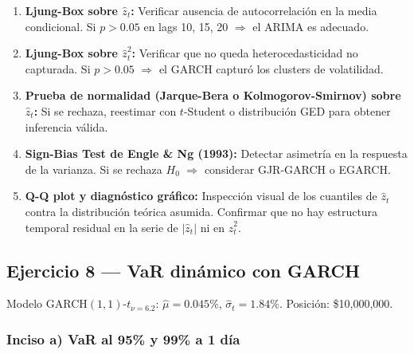 \documentclass[12pt,a4paper]{article}
\begin{document}
\begin{solucion}
\begin{enumerate}
  \item \textbf{Ljung-Box sobre $\hat{z}_t$:} Verificar ausencia de autocorrelación en la media condicional. Si $p>0.05$ en lags 10, 15, 20 $\Rightarrow$ el ARIMA es adecuado.
  \item \textbf{Ljung-Box sobre $\hat{z}_t^2$:} Verificar que no queda heterocedasticidad no capturada. Si $p>0.05$ $\Rightarrow$ el GARCH capturó los clusters de volatilidad.
  \item \textbf{Prueba de normalidad (Jarque-Bera o Kolmogorov-Smirnov) sobre $\hat{z}_t$:} Si se rechaza, reestimar con $t$-Student o distribución GED para obtener inferencia válida.
  \item \textbf{Sign-Bias Test de Engle \& Ng (1993):} Detectar asimetría en la respuesta de la varianza. Si se rechaza $H_0$ $\Rightarrow$ considerar GJR-GARCH o EGARCH.
  \item \textbf{Q-Q plot y diagnóstico gráfico:} Inspección visual de los cuantiles de $\hat{z}_t$ contra la distribución teórica asumida. Confirmar que no hay estructura temporal residual en la serie de $|\hat{z}_t|$ ni en $\hat{z}_t^2$.
\end{enumerate}
\end{solucion}

\subsection{Ejercicio 8 — VaR dinámico con GARCH}

Modelo GARCH$(1,1)$-$t_{\nu=6.2}$: $\hat{\mu}=0.045\%$, $\hat{\sigma}_t=1.84\%$. Posición: \$10{,}000{,}000.

\subsubsection*{Inciso a) VaR al 95\% y 99\% a 1 día}
\end{document}
